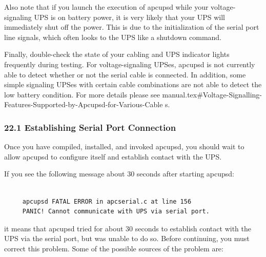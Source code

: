 Also note that if you launch the execution of apcupsd while your
voltage-signaling UPS is on battery power, it is very likely that your UPS
will immediately shut off the power. This is due to the initialization of the
serial port line signals, which often looks to the UPS like a shutdown
command.  

Finally, double-check the state of your cabling and UPS indicator lights
frequently during testing.  For voltage-signaling UPSes, apcupsd is not
currently able to detect whether or not the serial cable is connected. In
addition, some simple signaling UPSes with certain cable combinations are not
able to detect the low battery condition.  For more details please see 
{manual.tex#Voltage-Signalling-Features-Supported-by-Apcupsd-for-Various-Cable%
s}. 

\label{Establishing-Serial-Port-Connection}

\subsubsection*{22.1 Establishing Serial Port Connection}

\label{index-Testing_002c-Serial-221}
Once you have compiled, installed, and invoked apcupsd, you should wait to
allow apcupsd to configure itself and establish contact with the UPS.  

If you see the following message about 30 seconds after starting apcupsd: 

\footnotesize
\begin{verbatim}
     
     apcupsd FATAL ERROR in apcserial.c at line 156
     PANIC! Cannot communicate with UPS via serial port.
\end{verbatim}
\normalsize

it means that apcupsd tried for about 30 seconds to establish contact with the
UPS via the serial port, but was unable to do so. Before continuing, you must
correct this problem. Some of the possible sources of the problem are:  

